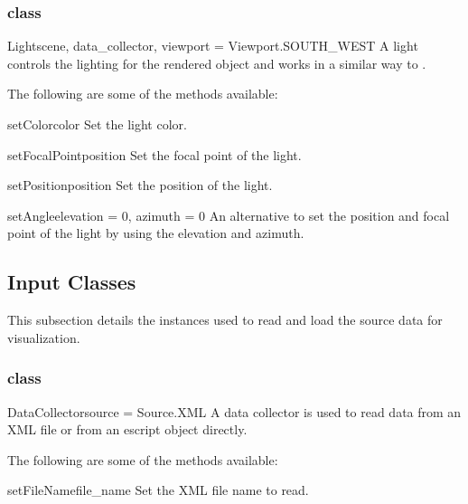 \subsubsection{\Light class}

\begin{classdesc}{Light}{scene, data_collector, viewport = Viewport.SOUTH_WEST}
A light controls the lighting for the rendered object and works in 
a similar way to \Camera.
\end{classdesc}

The following are some of the methods available:
\begin{methoddesc}[Light]{setColor}{color}
Set the light color.
\end{methoddesc}

\begin{methoddesc}[Light]{setFocalPoint}{position}
Set the focal point of the light.
\end{methoddesc}

\begin{methoddesc}[Light]{setPosition}{position}
Set the position of the light.
\end{methoddesc}

\begin{methoddesc}[Light]{setAngle}{elevation = 0, azimuth = 0}
An alternative to set the position and focal point of the light by using the 
elevation and azimuth.
\end{methoddesc}




\subsection{Input Classes}
This subsection details the instances used to read and load the source data
for visualization.

\subsubsection{\DataCollector class}

\begin{classdesc}{DataCollector}{source = Source.XML}
A data collector is used to read data from an XML file or from 
an escript object directly. 
\end{classdesc}

The following are some of the methods available:
\begin{methoddesc}[DataCollector]{setFileName}{file_name}
Set the XML file name to read.
\end{methoddesc}

